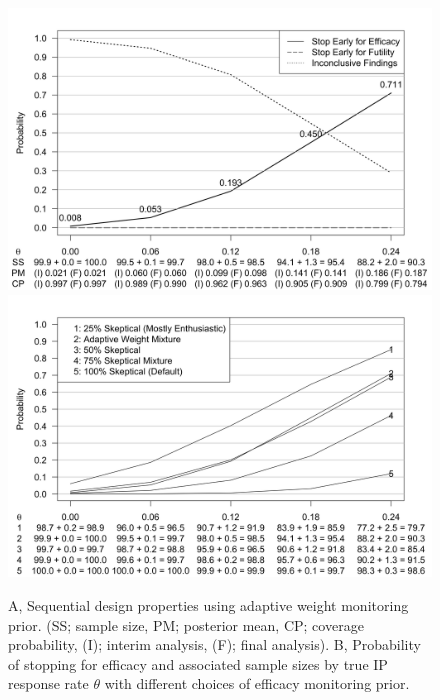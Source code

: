 \documentclass[useAMS,usenatbib,referee]{biom}
\begin{document}
\begin{figure}\begin{center}
      \includegraphics[width=6in]{figure9.png}
   \includegraphics[width=6in]{figure6.png}
    \caption{A, Sequential design properties using adaptive weight monitoring prior. (SS; sample size, PM; posterior mean, CP; coverage probability, (I); interim analysis, (F); final analysis). B, Probability of stopping for efficacy and associated sample sizes by true IP response rate $\theta$ with different choices of efficacy monitoring prior.}
\label{fig:ex2varyomega}
 \end{center}
\end{figure}
\end{document}
